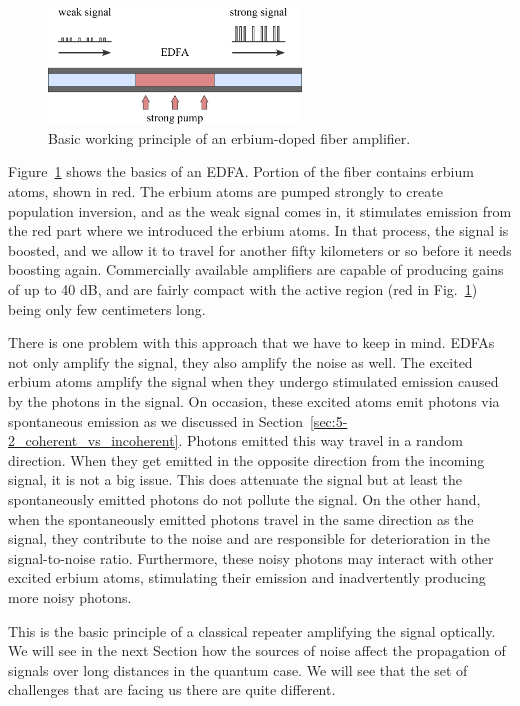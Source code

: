 \begin{figure}[t]
    \centering
    \includegraphics[width=0.6\textwidth]{lesson11/11-4_edfa.pdf}
    \caption[EDFA]{Basic working principle of an erbium-doped fiber amplifier.}
    \label{fig:11-4_edfa}
\end{figure}

Figure~\ref{fig:11-4_edfa} shows the basics of an EDFA.
Portion of the fiber contains erbium atoms, shown in red. The erbium atoms are pumped strongly to create population inversion, and as the weak signal comes in, it stimulates emission from the red part where we introduced the erbium atoms. In that process, the signal is boosted, and we allow it to travel for another fifty kilometers or so before it needs boosting again.
Commercially available amplifiers are capable of producing gains of up to 40 dB, and are fairly compact with the active region (red in Fig.~\ref{fig:11-4_edfa}) being only few centimeters long.

There is one problem with this approach that we have to keep in mind.
EDFAs not only amplify the signal, they also amplify the noise as well.
The excited erbium atoms amplify the signal when they undergo stimulated emission caused by the photons in the signal.
On occasion, these excited atoms emit photons via spontaneous emission as we discussed in Section~\ref{sec:5-2_coherent_vs_incoherent}.
Photons emitted this way travel in a random direction.
When they get emitted in the opposite direction from the incoming signal, it is not a big issue. This does attenuate the signal but at least the spontaneously emitted photons do not pollute the signal.
On the other hand, when the spontaneously emitted photons travel in the same direction as the signal, they contribute to the noise and are responsible for deterioration in the signal-to-noise ratio.
Furthermore, these noisy photons may interact with other excited erbium atoms, stimulating their emission and inadvertently producing more noisy photons.

This is the basic principle of a classical repeater amplifying the signal optically. We will see in the next Section how the sources of noise affect the propagation of signals over long distances in the quantum case.
We will see that the set of challenges that are facing us there are quite different.



